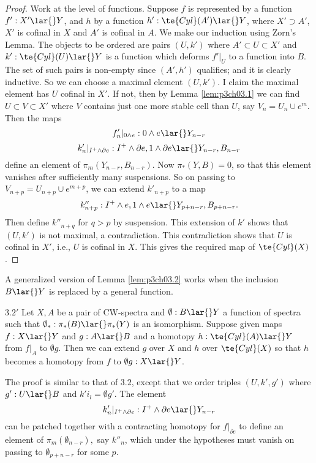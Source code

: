 \documentclass[../main]{subfiles}
\begin{document}
\begin{proof}
Work at the level of functions. Suppose $f$ is represented by a function $f':X'\lar{}Y$, and $h$ by a function $h':\te{Cyl}(A')\lar{}Y$, where $X'\supset A'$, $X'$ is cofinal in $X$ and $A'$ is cofinal in $A$. We make our induction using Zorn's Lemma. The objects to be ordered are pairs $(U,k')$ where $A'\subset U\subset X'$ and $k':\te{Cyl}(U)\lar{} Y$ is a function which deforms $f'|_U$ to a function into $B$. 
The set of such pairs is non-empty since $(A',h')$ qualifies; and it is clearly inductive. So we can choose a
maximal element $(U,k')$. I claim the maximal element has $U$ cofinal
in $X'$. If not, then by Lemma \ref{lem:p3ch03.1} we can find $U\subset V\subset X'$ where $V$ contains just one more stable cell than $U$, say $V_n=U_n\cup e^m$. Then the maps \[f'_n|_{0\wedge e}: 0\wedge e\lar{} Y_{n-r} \]
\[k_n'|_{I^+ \wedge \partial e}: I^+ \wedge \partial e, 1\wedge \partial e\lar{} Y_{n-r},B_{n-r} \]
define an element of $\pi_m(Y_{n-r},B_{n-r})$. Now $\pi_\ast(Y,B)=0$, so that this element vanishes after sufficiently many suspensions. So on passing to $V_{n+p}= U_{n+p}\cup e^{m+p}$, we can extend $k'_{n+p}$ to a map \[k''_{n+p}: I^+\wedge e, 1\wedge e \lar{} Y_{p+n-r},B_{p+n-r}. \]
Then define $k''_{n+q}$ for $q>p$ by suspension. This extension of $k'$ shows that $(U,k')$ is not maximal, a contradiction. This contradiction shows that $U$ is cofinal in $X'$, i.e., $U$ is cofinal in $X$. This gives the required map of $\te{Cyl}(X)$.
\end{proof}
A generalized version of Lemma \ref{lem:p3ch03.2} works when the inclusion $B\lar{}Y$ is replaced by a general function. 

\begin{customlemma}{$3.2'$} \label{lem:p3ch03.2'}
Let $X,A$ be a pair of CW-spectra and $\emptyset: B\lar{}  Y$ a function of spectra such that $\emptyset_\ast:\pi_\ast (B)\lar{}\pi_\ast(Y)$ is an isomorphism. Suppose given maps $f:X\lar{}Y$ and $g:A\lar{}B$ and a homotopy $h:\te{Cyl}(A)\lar{}Y$ from $f|_A$ to $\emptyset g$. Then we can extend $g$ over $X$ and $h$ over $\te{Cyl}(X)$ so that $h$ becomes a homotopy from $f$ to $\emptyset g:X\lar{}Y$.
\end{customlemma}
The proof is similar to that of $3.2$, except that we order triples $(U,k',g')$ where $g':U\lar{}B$ and $k' i_l = \emptyset g'$. The element \[k'_n|_{I^+\wedge \partial e}: I^+\wedge \partial e\lar{} Y_{n-r}\]
can be patched together with a contracting homotopy for $f|_{\partial e}$ to define an element of $\pi_m(\emptyset_{n-r}),$ say $k''_n$, which under the hypotheses must vanish on passing to $\emptyset_{p+n-r}$ for some $p$.
\end{document}
